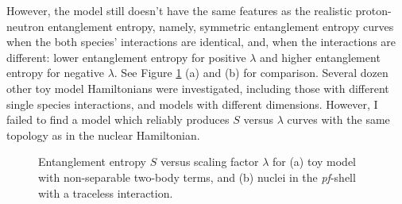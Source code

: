 However, the model still doesn't have the same features as the
realistic proton-neutron entanglement entropy, namely, symmetric
entanglement entropy curves when the both species' interactions
are identical, and, when the interactions are different: lower entanglement entropy 
for positive $\lambda$ and higher entanglement entropy for negative $\lambda$.
See Figure \ref{best} (a) and (b) for comparison.
Several dozen other toy model Hamiltonians were investigated, including those with different 
single species interactions, and models with different dimensions. However, I
 failed to find a model which reliably produces $S$ versus $\lambda$ curves with 
the same topology as in the nuclear Hamiltonian.
\begin{figure}[t]
    \centering
	\qquad
	\caption{Entanglement entropy $S$ versus scaling factor $\lambda$ for (a) toy model 
    with non-separable two-body terms, and (b) nuclei in the \textit{pf}-shell with a traceless interaction.}   
	\label{best}
\end{figure}


